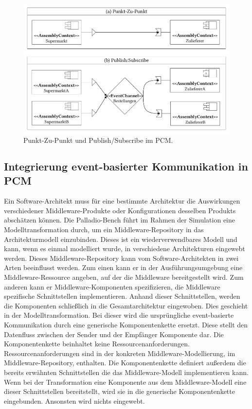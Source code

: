 \begin{figure}
\center
  \includegraphics[width=1\textwidth]{images/grundlagen/grundlagenEventSystem.pdf}
  \caption{Punkt-Zu-Punkt und Publish/Subscribe im PCM.}
  \label{img:grundlageneventssystem}
\end{figure}



\subsection{Integrierung event-basierter Kommunikation in PCM}
\label{sec:eventbasetransformation}
Ein Software-Architekt muss für eine bestimmte Architektur die Auswirkungen verschiedener Middleware-Produkte oder Konfigurationen desselben Produkts abschätzen können. Die Palladio-Bench führt im Rahmen der Simulation eine Modelltransformation durch, um ein Middleware-Repository in das Architekturmodell einzubinden. Dieses ist ein wiederverwendbares Modell und kann, wenn es einmal modelliert wurde, in verschiedene Architekturen eingewebt werden. Dieses Middleware-Repository kann vom Software-Architekten in zwei Arten beeinflusst werden. Zum einen kann er in der Ausführungsumgebung eine Middleware-Ressource angeben, auf der die Middleware bereitgestellt wird. Zum anderen kann er Middleware-Komponen\-ten spezifizieren, die Middleware spezifische Schnittstellen implementieren. Anhand dieser Schnittstellen, werden die Komponenten schließlich in die Gesamtarchitektur eingewoben. Dies geschieht in der Modelltransformation. Bei dieser wird die ursprüngliche event-basierte Kommunikation durch eine generische Komponentenkette ersetzt. Diese stellt den Datenfluss zwischen der Sender und der Empfänger Komponente dar. Die Komponentenkette beinhaltet keine Ressourcenanforderungen. Ressourcenanforderungen sind in der konkreten Middleware-Modellierung, im Middleware-Repository, enthalten. Die Komponentenkette definiert außerdem die bereits erwähnten Schnittstellen die das Middleware-Modell implementieren kann. Wenn bei der Transformation eine Komponente aus dem Middleware-Modell eine dieser Schnittstellen bereitstellt, wird sie in die generische Komponentenkette eingebunden. Ansonsten wird nichts eingewebt.

